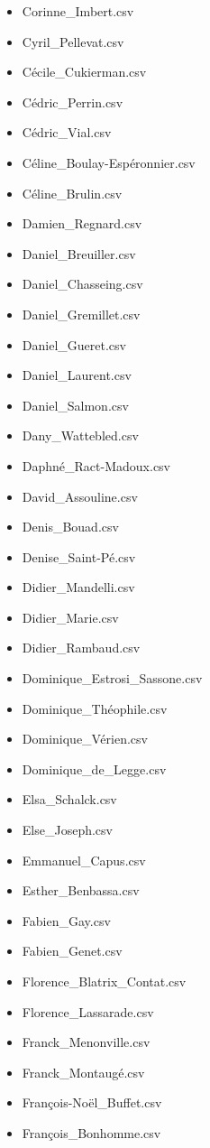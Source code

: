 \documentclass[a4paper,12pt,twoside]{book}
\begin{document}
\begin{itemize}
  \item Corinne\_Imbert.csv
  \item Cyril\_Pellevat.csv
  \item Cécile\_Cukierman.csv
  \item Cédric\_Perrin.csv
  \item Cédric\_Vial.csv
  \item Céline\_Boulay-Espéronnier.csv
  \item Céline\_Brulin.csv
  \item Damien\_Regnard.csv
  \item Daniel\_Breuiller.csv
  \item Daniel\_Chasseing.csv
  \item Daniel\_Gremillet.csv
  \item Daniel\_Gueret.csv
  \item Daniel\_Laurent.csv
  \item Daniel\_Salmon.csv
  \item Dany\_Wattebled.csv
  \item Daphné\_Ract-Madoux.csv
  \item David\_Assouline.csv
  \item Denis\_Bouad.csv
  \item Denise\_Saint-Pé.csv
  \item Didier\_Mandelli.csv
  \item Didier\_Marie.csv
  \item Didier\_Rambaud.csv
  \item Dominique\_Estrosi\_Sassone.csv
  \item Dominique\_Théophile.csv
  \item Dominique\_Vérien.csv
  \item Dominique\_de\_Legge.csv
  \item Elsa\_Schalck.csv
  \item Else\_Joseph.csv
  \item Emmanuel\_Capus.csv
  \item Esther\_Benbassa.csv
  \item Fabien\_Gay.csv
  \item Fabien\_Genet.csv
  \item Florence\_Blatrix\_Contat.csv
  \item Florence\_Lassarade.csv
  \item Franck\_Menonville.csv
  \item Franck\_Montaugé.csv
  \item François-Noël\_Buffet.csv
  \item François\_Bonhomme.csv

\end{itemize}
\end{document}

